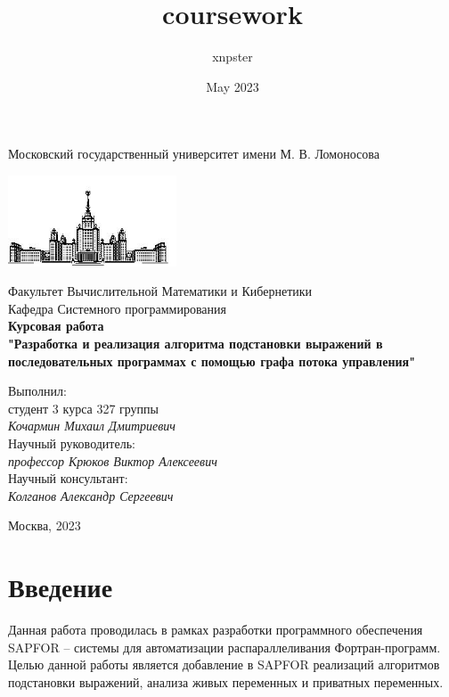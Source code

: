 \documentclass{article}
\title{coursework}
\author{xnpster}
\date{May 2023}
\begin{document}
\lstset{style=mystyle}


\begin{titlepage}
\begin{center}
    Московский государственный университет имени М. В. Ломоносова

    \includegraphics[width=50mm]{msu_title.png}

    \bigskip
    Факультет Вычислительной Математики и Кибернетики\\
    Кафедра Системного программирования\\[10mm]
    
    \textsf{\large\bfseries
        Курсовая работа\\
        "Разработка и реализация алгоритма подстановки выражений в последовательных программах с помощью графа потока управления"\\[20mm]
    }
    
    \begin{flushright}
        \parbox{0.5\textwidth}{
        	Выполнил:\\
        	студент 3 курса 327 группы \\
        	\emph{Кочармин Михаил Дмитриевич}\\[5mm]
            Научный руководитель:\\
        	\emph{профессор Крюков Виктор Алексеевич} \\
            Научный консультант:\\
        	\emph{Колганов Александр Сергеевич} \\
    }
    \end{flushright}
    \vspace{\fill}
    Москва, 2023
\end{center}
\end{titlepage}

\newpage
\tableofcontents
\newpage

\section{Введение}
Данная работа проводилась в рамках разработки программного обеспечения SAPFOR 
-- системы для автоматизации распараллеливания Фортран-программ. Целью данной работы
является добавление в SAPFOR реализаций алгоритмов подстановки выражений, анализа живых переменных и приватных переменных.
\end{document}
